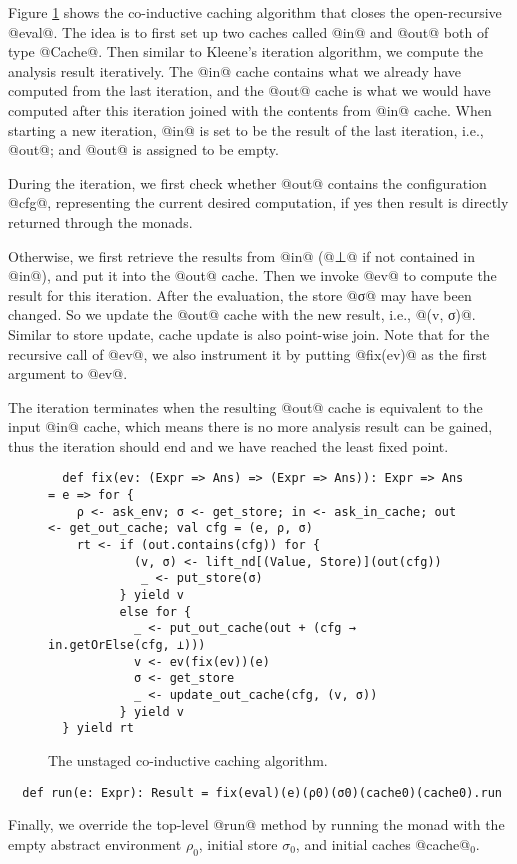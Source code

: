 Figure \ref{fig:coind_cache} shows the co-inductive caching algorithm that
closes the open-recursive @eval@.
The idea is to first set up two caches called @in@ and @out@ both of type
@Cache@. Then similar to Kleene's iteration algorithm, we compute the analysis
result iteratively. The @in@ cache contains what we already have computed from
the last iteration, and the @out@ cache is what we would have computed after this
iteration joined with the contents from @in@ cache.
When starting a new iteration, @in@ is set to be the result of the last
iteration, i.e., @out@; and @out@ is assigned to be empty.

During the iteration, we first check whether @out@ contains the configuration
@cfg@, representing the current desired computation, if
yes then result is directly returned through the monads.

Otherwise, we first retrieve the results from @in@ (@⊥@ if not contained in
@in@), and put it into the @out@ cache.
Then we invoke @ev@ to compute the result for this iteration.
After the evaluation, the store @σ@ may have been changed. So we update the
@out@ cache with the new result, i.e., @(v, σ)@. Similar to store update, cache
update is also point-wise join.
Note that for the recursive call of @ev@, we also instrument it by putting
@fix(ev)@ as the first argument to @ev@.

The iteration terminates when the resulting @out@ cache is equivalent to the
input @in@ cache, which means there is no more analysis result can be gained,
thus the iteration should end and we have reached the least fixed point.

\begin{figure}[t!]
  \centering
\begin{lstlisting}
  def fix(ev: (Expr => Ans) => (Expr => Ans)): Expr => Ans = e => for {
    ρ <- ask_env; σ <- get_store; in <- ask_in_cache; out <- get_out_cache; val cfg = (e, ρ, σ)
    rt <- if (out.contains(cfg)) for {
            (v, σ) <- lift_nd[(Value, Store)](out(cfg))
             _ <- put_store(σ)
          } yield v
          else for {
            _ <- put_out_cache(out + (cfg → in.getOrElse(cfg, ⊥)))
            v <- ev(fix(ev))(e)
            σ <- get_store
            _ <- update_out_cache(cfg, (v, σ))
          } yield v
  } yield rt
\end{lstlisting}
\vspace{-1em}
\caption{The unstaged co-inductive caching algorithm.}
\label{fig:coind_cache}
\end{figure}

\begin{lstlisting}
  def run(e: Expr): Result = fix(eval)(e)(ρ0)(σ0)(cache0)(cache0).run
\end{lstlisting}

Finally, we override the top-level @run@ method by running the monad with
the empty abstract environment $\rho_0$, initial store $\sigma_0$, and initial
caches @cache@$_0$.
